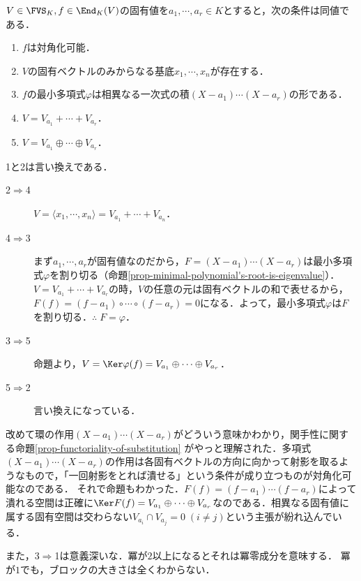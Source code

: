 \documentclass[uplatex, dvipdfmx]{jsreport}
\begin{document}
\begin{corollary}[対角化可能条件]\label{cor-diagonalizability}
    $V\in\FVS_K,f\in\End_K(V)$の固有値を$a_1,\cdots,a_r\in K$とすると，次の条件は同値である．
    \begin{enumerate}
        \item $f$は対角化可能．
        \item $V$の固有ベクトルのみからなる基底$x_1,\cdots,x_n$が存在する．
        \item $f$の最小多項式$\varphi$は相異なる一次式の積$(X-a_1)\cdots(X-a_r)$の形である．
        \item $V=V_{a_1}+\cdots+V_{a_r}$．
        \item $V=V_{a_1}\oplus\cdots\oplus V_{a_r}$．
    \end{enumerate}
\end{corollary}
\begin{Proof}
    1と2は言い換えである．
    \begin{description}
        \item[2$\Rightarrow$4] $V=\langle x_1,\cdots,x_n\rangle=V_{a_1}+\cdots+V_{a_n}$．
        \item[4$\Rightarrow$3] まず$a_1,\cdots,a_r$が固有値なのだから，$F=(X-a_1)\cdots(X-a_r)$は最小多項式$\varphi$を割り切る（命題\ref{prop-minimal-polynomial's-root-is-eigenvalue}）．$V=V_{a_1}+\cdots+V_{a_r}$の時，$V$の任意の元は固有ベクトルの和で表せるから，$F(f)=(f-a_1)\circ\cdots\circ(f-a_r)=0$になる．よって，最小多項式$\varphi$は$F$を割り切る．$\therefore\;F=\varphi$．
        \item[3$\Rightarrow$5] 命題より，$V=\Ker\varphi(f)=V_{a_1}\oplus\cdots\oplus V_{a_r}$．
        \item[5$\Rightarrow$2] 言い換えになっている．
    \end{description}
\end{Proof}
\begin{remark}
    改めて環の作用$(X-a_1)\cdots(X-a_r)$がどういう意味かわかり，関手性に関する命題\ref{prop-functoriality-of-substitution}
    がやっと理解された．多項式$(X-a_1)\cdots(X-a_r)$の作用は各固有ベクトルの方向に向かって射影を取るようなもので，「一回射影をとれば潰せる」という条件が成り立つものが対角化可能なのである．
    それで命題もわかった．$F(f)=(f-a_1)\cdots(f-a_r)$によって潰れる空間は正確に$\Ker F(f)=V_{a_1}\oplus\cdots\oplus V_{a_r}$なのである．相異なる固有値に属する固有空間は交わらない$V_{a_i}\cap V_{a_j}=0\;(i\ne j)$という主張が紛れ込んでいる．

    また，3$\Rightarrow$1は意義深いな．冪が$2$以上になるとそれは冪零成分を意味する．
    冪が$1$でも，ブロックの大きさは全くわからない．
\end{remark}
\end{document}

